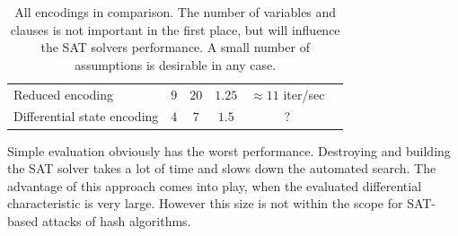 \begin{table}
\begin{center}
\begin{tabular}{lccccc}
   Reduced encoding            & $9$          & $20$    & $1.25$        & $\approx11$ iter/sec \\
   Differential state encoding & $4$          & $7$     & $1.5$         & ? \\
  \end{tabular}
  \caption[All encodings in comparison]{
    All encodings in comparison.
    The number of variables and clauses is not important in the first place, but will influence the SAT solvers performance.
    A small number of assumptions is desirable in any case.
  }
  \label{tab:encoding-cmp}
 \end{center}
\end{table}

Simple evaluation obviously has the worst performance. Destroying and building the SAT solver takes a lot of time and slows down the automated search. The advantage of this approach comes into play, when the evaluated differential characteristic is very large. However this size is not within the scope for SAT-based attacks of hash algorithms.

